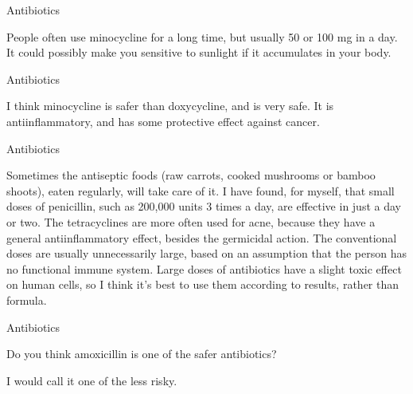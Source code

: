 \documentclass[11pt,oneside,openany,extrafontsizes]{memoir}
\begin{document}
\begin{standalonequote}{Antibiotics}

    \begin{answer}
       People often use minocycline for a long time, but usually 50 or 100 mg in a day. It could possibly make you sensitive to sunlight if it accumulates in your body. 
    \end{answer}
\end{standalonequote}

\begin{standalonequote}{Antibiotics}

    \begin{answer}
       I think minocycline is safer than doxycycline, and is very safe. It is antiinflammatory, and has some protective effect against cancer. 
    \end{answer}
\end{standalonequote}

\begin{standalonequote}{Antibiotics}

    \begin{answer}
       Sometimes the antiseptic foods (raw carrots, cooked mushrooms or bamboo shoots), eaten regularly, will take care of it. I have found, for myself, that small doses of penicillin, such as 200,000 units 3 times a day, are effective in just a day or two. The tetracyclines are more often used for acne, because they have a general antiinflammatory effect, besides the germicidal action. The conventional doses are usually unnecessarily large, based on an assumption that the person has no functional immune system. Large doses of antibiotics have a slight toxic effect on human cells, so I think it's best to use them according to results, rather than formula. 
    \end{answer}
\end{standalonequote}

\begin{qaexchange}{Antibiotics}

    \begin{question}
        Do you think amoxicillin is one of the safer antibiotics?
    \end{question}

    \begin{answer}
      I would call it one of the less risky.
    \end{answer}
\end{qaexchange}
\end{document}
